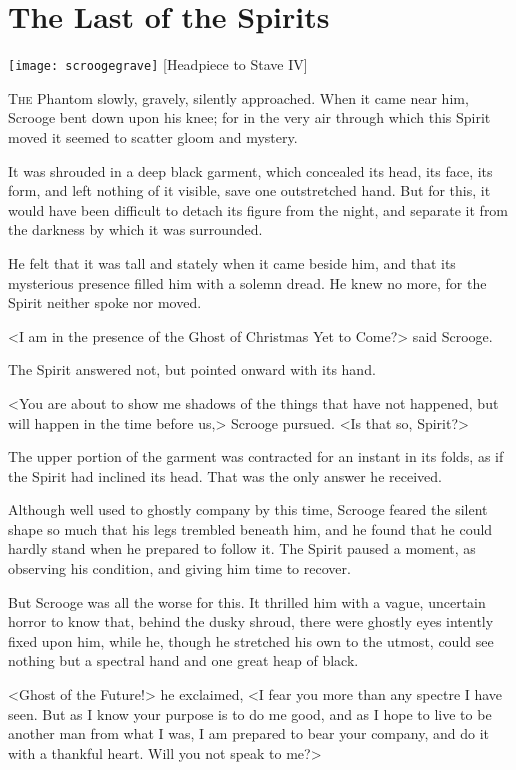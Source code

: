 \chapter{The Last of the Spirits}
	
\begin{minipage}[c]{\textwidth}
\texttt{[image: scroogegrave]}
[Headpiece to Stave IV]{}
\end{minipage}
\vfill

\lettrine[lines=4]{T}{he} Phantom slowly, gravely, silently approached. When it came near him, Scrooge bent down upon his knee; for in the very air through which this Spirit moved it seemed to scatter gloom and mystery.

It was shrouded in a deep black garment, which concealed its head, its face, its form, and left nothing of it visible, save one outstretched hand. But for this, it would have been difficult to detach its figure from the night, and separate it from the darkness by which it was surrounded.

He felt that it was tall and stately when it came beside him, and that its mysterious presence filled him with a solemn dread. He knew no more, for the Spirit neither spoke nor moved.

<I am in the presence of the Ghost of Christmas Yet to Come?> said Scrooge.

The Spirit answered not, but pointed onward with its hand.

<You are about to show me shadows of the things that have not happened, but will happen in the time before us,> Scrooge pursued. <Is that so, Spirit?>

The upper portion of the garment was contracted for an instant in its folds, as if the Spirit had inclined its head. That was the only answer he received.

Although well used to ghostly company by this time, Scrooge feared the silent shape so much that his legs trembled beneath him, and he found that he could hardly stand when he prepared to follow it. The Spirit paused a moment, as observing his condition, and giving him time to recover.

But Scrooge was all the worse for this. It thrilled him with a vague, uncertain horror to know that, behind the dusky shroud, there were ghostly eyes intently fixed upon him, while he, though he stretched his own to the utmost, could see nothing but a spectral hand and one great heap of black.

<Ghost of the Future!> he exclaimed, <I fear you more than any spectre I have seen. But as I know your purpose is to do me good, and as I hope to live to be another man from what I was, I am prepared to bear your company, and do it with a thankful heart. Will you not speak to me?>

